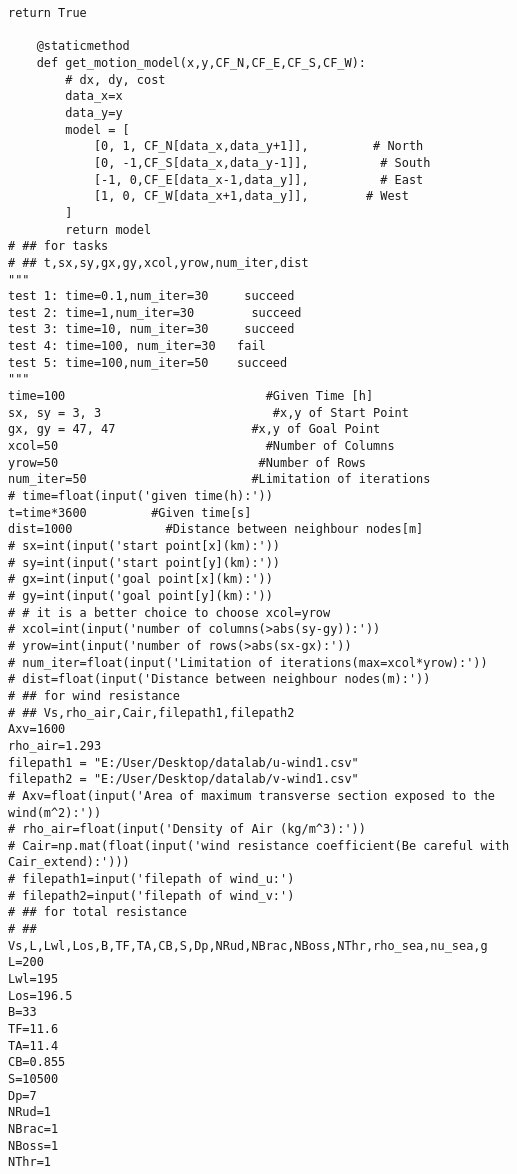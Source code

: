 \begin{lstlisting}[caption=Testing codes (\autoref{TestResults}), label=TestCodes]
        return True

    @staticmethod
    def get_motion_model(x,y,CF_N,CF_E,CF_S,CF_W):
        # dx, dy, cost
        data_x=x
        data_y=y
        model = [
            [0, 1, CF_N[data_x,data_y+1]],         # North
            [0, -1,CF_S[data_x,data_y-1]],          # South
            [-1, 0,CF_E[data_x-1,data_y]],          # East
            [1, 0, CF_W[data_x+1,data_y]],        # West
        ]
        return model
# ## for tasks
# ## t,sx,sy,gx,gy,xcol,yrow,num_iter,dist
""" 
test 1: time=0.1,num_iter=30     succeed
test 2: time=1,num_iter=30        succeed
test 3: time=10, num_iter=30     succeed
test 4: time=100, num_iter=30   fail
test 5: time=100,num_iter=50    succeed
"""
time=100                            #Given Time [h]
sx, sy = 3, 3                        #x,y of Start Point
gx, gy = 47, 47                   #x,y of Goal Point
xcol=50                             #Number of Columns
yrow=50                            #Number of Rows
num_iter=50                       #Limitation of iterations
# time=float(input('given time(h):'))
t=time*3600         #Given time[s]
dist=1000             #Distance between neighbour nodes[m]
# sx=int(input('start point[x](km):'))
# sy=int(input('start point[y](km):'))
# gx=int(input('goal point[x](km):'))
# gy=int(input('goal point[y](km):'))
# # it is a better choice to choose xcol=yrow
# xcol=int(input('number of columns(>abs(sy-gy)):'))
# yrow=int(input('number of rows(>abs(sx-gx):'))
# num_iter=float(input('Limitation of iterations(max=xcol*yrow):'))
# dist=float(input('Distance between neighbour nodes(m):'))
# ## for wind resistance
# ## Vs,rho_air,Cair,filepath1,filepath2
Axv=1600
rho_air=1.293
filepath1 = "E:/User/Desktop/datalab/u-wind1.csv"
filepath2 = "E:/User/Desktop/datalab/v-wind1.csv"
# Axv=float(input('Area of maximum transverse section exposed to the wind(m^2):'))
# rho_air=float(input('Density of Air (kg/m^3):')) 
# Cair=np.mat(float(input('wind resistance coefficient(Be careful with Cair_extend):')))
# filepath1=input('filepath of wind_u:')
# filepath2=input('filepath of wind_v:')
# ## for total resistance
# ## Vs,L,Lwl,Los,B,TF,TA,CB,S,Dp,NRud,NBrac,NBoss,NThr,rho_sea,nu_sea,g
L=200
Lwl=195
Los=196.5 
B=33 
TF=11.6
TA=11.4 
CB=0.855 
S=10500
Dp=7
NRud=1
NBrac=1
NBoss=1
NThr=1 


\end{lstlisting}
